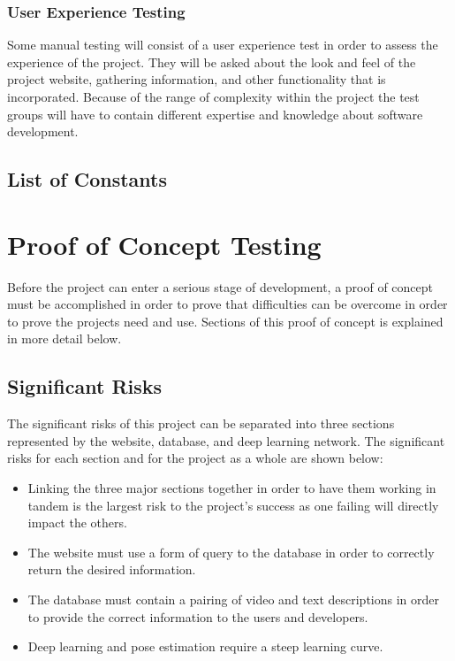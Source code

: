\documentclass{scrreprt}
\begin{document}
\subsection{User Experience Testing}
Some manual testing will consist of a user experience test in order to assess the experience of the project. They will be asked about the look and feel of the project website, gathering information, and other functionality that is incorporated. Because of the range of complexity within the project the test groups will have to contain different expertise and knowledge about software development.

\section{List of Constants}

\chapter{Proof of Concept Testing}
Before the project can enter a serious stage of development, a proof of concept must be accomplished in order to prove that difficulties can be overcome in order to prove the projects need and use. Sections of this proof of concept is explained in more detail below.

\section{Significant Risks}
The significant risks of this project can be separated into three sections represented by the website, database, and deep learning network. The significant risks for each section and for the project as a whole are shown below:

\begin{itemize}
  \item Linking the three major sections together in order to have them working in tandem is the largest risk to the project's success as one failing will directly impact the others.
  \item The website must use a form of query to the database in order to correctly return the desired information.
  \item The database must contain a pairing of video and text descriptions in order to provide the correct information to the users and developers.
  \item Deep learning and pose estimation require a steep learning curve.
\end{itemize}
\end{document}
